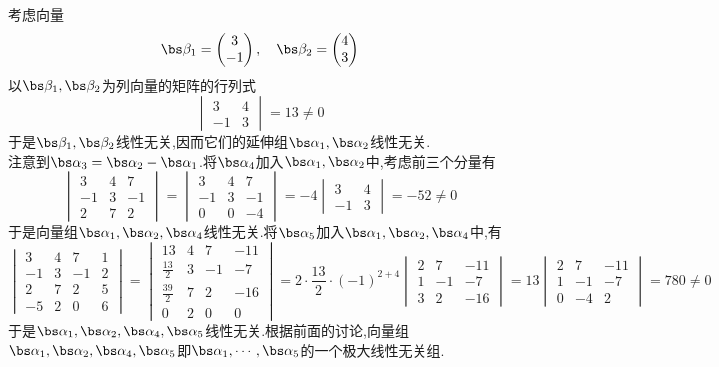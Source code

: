 \documentclass{ctexart}
\begin{document}
\begin{solution}
    考虑向量
    \[\bs\beta_1=\begin{pmatrix}
        3\\-1
    \end{pmatrix},\quad\bs\beta_2=\begin{pmatrix}
        4\\3
    \end{pmatrix}\]
    以$\bs\beta_1,\bs\beta_2$为列向量的矩阵的行列式
    \[\begin{vmatrix}
        3&4\\
        -1&3
    \end{vmatrix}=13\neq0\]
    于是$\bs\beta_1,\bs\beta_2$线性无关,因而它们的延伸组$\bs\alpha_1,\bs\alpha_2$线性无关.\\
    \indent 注意到$\bs\alpha_3=\bs\alpha_2-\bs\alpha_1$.将$\bs\alpha_4$加入$\bs\alpha_1,\bs\alpha_2$中,考虑前三个分量有
    \[\begin{vmatrix}
        3&4&7\\
        -1&3&-1\\
        2&7&2
    \end{vmatrix}=\begin{vmatrix}
        3&4&7\\
        -1&3&-1\\
        0&0&-4
    \end{vmatrix}=-4\begin{vmatrix}
        3&4\\-1&3
    \end{vmatrix}=-52\neq0\]
    于是向量组$\bs\alpha_1,\bs\alpha_2,\bs\alpha_4$线性无关.将$\bs\alpha_5$加入$\bs\alpha_1,\bs\alpha_2,\bs\alpha_4$中,有
    \[\begin{vmatrix}
        3&4&7&1\\
        -1&3&-1&2\\
        2&7&2&5\\
        -5&2&0&6
    \end{vmatrix}=\begin{vmatrix}
        13&4&7&-11\\
        \frac{13}{2}&3&-1&-7\\
        \frac{39}{2}&7&2&-16\\
        0&2&0&0
    \end{vmatrix}=2\cdot\dfrac{13}{2}\cdot(-1)^{2+4}\begin{vmatrix}
        2&7&-11\\
        1&-1&-7\\
        3&2&-16
    \end{vmatrix}=13\begin{vmatrix}
        2&7&-11\\
        1&-1&-7\\
        0&-4&2
    \end{vmatrix}=780\neq0\]
    于是$\bs\alpha_1,\bs\alpha_2,\bs\alpha_4,\bs\alpha_5$线性无关.根据前面的讨论,向量组$\bs\alpha_1,\bs\alpha_2,\bs\alpha_4,\bs\alpha_5$即$\bs\alpha_1,\cdots,\bs\alpha_5$的一个极大线性无关组.
\end{solution}
\begin{problem}
    
\end{problem}
\end{document}
